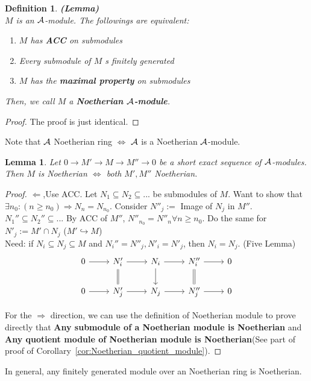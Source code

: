 \documentclass[11pt]{article}
\newtheorem{lemma}[thm]{Lemma}
\newtheorem{dfn}[thm]{Definition}
\newcommand{\cala}{{\cal A}}
\newcommand{\Lrta}{\Longrightarrow}
\newcommand{\lrta}{\longrightarrow}
\newcommand{\Llta}{\Longleftarrow}
\newcommand{\Llrta}{\Longleftrightarrow}
\newcommand{\inj}{\hookrightarrow}
\begin{document}
\begin{dfn}\textbf{(Lemma)}\\
$M$ is an $\cala$-module. The followings are equivalent:
\begin{enumerate}[label=(\alph*)]
\item $M$ has \textbf{ACC} on submodules
\item Every submodule of $M$ s finitely generated
\item $M$ has the \textbf{maximal property} on submodules
\end{enumerate}
Then, we call $M$ a \textbf{Noetherian $\cala$-module}.
\end{dfn}
\begin{proof}
The proof is just identical.
\end{proof}

Note that $\cala$ Noetherian ring $\Llrta $ $\cala$ is a Noetherian $\cala$-module.

\begin{lemma}\label{lem:SES_Noetherian}
Let $0\lrta M'\lrta M\lrta M''\lrta 0$ be a short exact sequence of $\cala$-modules. Then $M$ is Noetherian $\Llrta $ both $M', M''$ Noetherian.
\end{lemma}
\begin{proof}
$\Llta$,Use ACC. Let $N_1\subseteq N_2\subseteq ...$ be submodules of $M$. Want to show that $\exists n_0 :(n\geq n_0)\Lrta N_n=N_{n_0}$.
Consider $N''_j:=$ Image of $N_j$ in $M''$. $ N_1''\subseteq N_2''\subseteq ...$ By ACC of $M''$, $N''_{n_0}=N''_{n}\forall n\geq n_0$. Do the same for $N'_j:=M'\cap N_j$ ($M'\inj M$)\\
Need: if $N_i\subseteq N_j\subseteq M$ and $N_i''=N''_j, N'_i=N'_j$, then $N_i=N_j$. (Five Lemma)
\[
\begin{tikzcd}
0\ar[r] & N_i'\ar[r]\ar[d,equal] & N_i\ar[r]\ar[d] & N_i''\ar[r]\ar[d,equal] & 0\\
0\ar[r] & N_j'\ar[r] & N_j\ar[r] & N_j''\ar[r] & 0
\end{tikzcd}
\]

For the $\Lrta$ direction, we can use the definition of Noetherian module to prove directly that \textbf{Any submodule of a Noetherian module is Noetherian} and \textbf{Any quotient module of Noetherian module is Noetherian}(See part of proof of Corollary~\ref{cor:Noetherian_quotient_module}).
\end{proof}

In general, any finitely generated module over an Noetherian ring is Noetherian.
\end{document}
